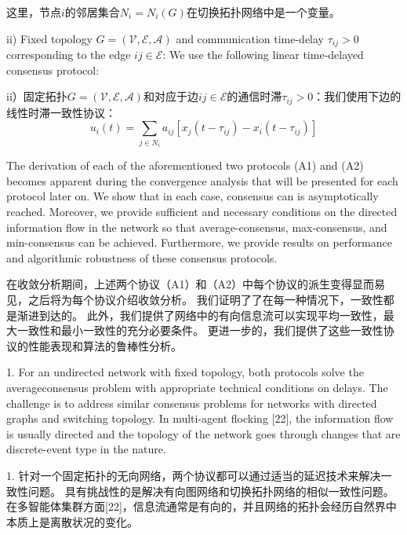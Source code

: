\documentclass{article}
\begin{document}
\noindent 这里，节点$i$的邻居集合$N_i=N_i(G)$在切换拓扑网络中是一个变量。

{\color[gray]{0.5}
ii) Fixed topology $G=(\mathcal{V}, \mathcal{E}, \mathcal{A})$ and communication time-delay $\tau_{ij}>0$ corresponding to the edge $ij\in \mathcal{E}$: We use the following linear time-delayed consensus protocol:
}

ii）固定拓扑$G=(\mathcal{V}, \mathcal{E}, \mathcal{A})$和对应于边$ij\in \mathcal{E}$的通信时滞$\tau_{ij}>0$：我们使用下边的线性时滞一致性协议：
\begin{equation}
    u_i(t) = \sum_{j\in N_i}a_{ij}[x_j(t-\tau_{ij})-x_i(t-\tau_{ij})]
    \tag{A2}
    \label{A2}
\end{equation}

{\color[gray]{0.5}
The derivation of each of the aforementioned two protocols (A1) and (A2) becomes apparent during the convergence analysis that will be presented for each protocol later on. 
We show that in each case, consensus can is asymptotically reached. 
Moreover, we provide suﬃcient and necessary conditions on the directed information ﬂow in the network so that average-consensus, max-consensus, and min-consensus can be achieved. 
Furthermore, we provide results on performance and algorithmic robustness of these consensus protocols.
}

在收敛分析期间，上述两个协议（A1）和（A2）中每个协议的派生变得显而易见，之后将为每个协议介绍收敛分析。
我们证明了了在每一种情况下，一致性都是渐进到达的。
此外，我们提供了网络中的有向信息流可以实现平均一致性，最大一致性和最小一致性的充分必要条件。
更进一步的，我们提供了这些一致性协议的性能表现和算法的鲁棒性分析。

{\color[gray]{0.5}
 1. For an undirected network with ﬁxed topology, both protocols solve the averageconsensus problem with appropriate technical conditions on delays. 
The challenge is to address similar consensus problems for networks with directed graphs and switching topology. 
In multi-agent ﬂocking [22], the information ﬂow is usually directed and the topology of the network goes through changes that are discrete-event type in the nature.
}

 1. 针对一个固定拓扑的无向网络，两个协议都可以通过适当的延迟技术来解决一致性问题。
具有挑战性的是解决有向图网络和切换拓扑网络的相似一致性问题。
在多智能体集群方面[22]，信息流通常是有向的，并且网络的拓扑会经历自然界中本质上是离散状况的变化。
\end{document}
